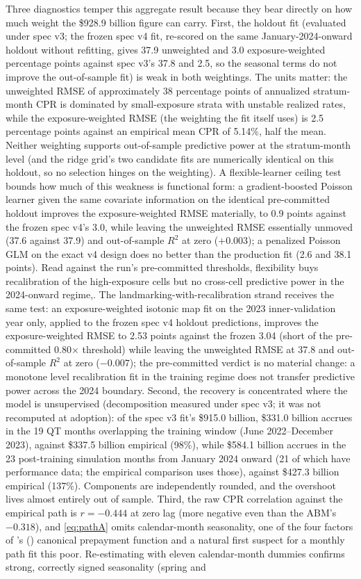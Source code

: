 \documentclass[12pt]{article}
\newcommand{\citepos}[1]{\citeauthor{#1}'s (\citeyear{#1})}
\begin{document}
Three diagnostics temper this aggregate result because they bear directly on how much weight the \$928.9 billion figure can carry. First, the holdout fit (evaluated under spec v3; the frozen spec v4 fit, re-scored on the same January-2024-onward holdout without refitting, gives 37.9 unweighted and 3.0 exposure-weighted percentage points against spec v3's 37.8 and 2.5, so the seasonal terms do not improve the out-of-sample fit) is weak in both weightings. The units matter: the unweighted RMSE of approximately 38 percentage points of annualized stratum-month CPR is dominated by small-exposure strata with unstable realized rates, while the exposure-weighted RMSE (the weighting the fit itself uses) is 2.5 percentage points against an empirical mean CPR of 5.14\%, half the mean. Neither weighting supports out-of-sample predictive power at the stratum-month level (and the ridge grid's two candidate fits are numerically identical on this holdout, so no selection hinges on the weighting). A flexible-learner ceiling test bounds how much of this weakness is functional form: a gradient-boosted Poisson learner given the same covariate information on the identical pre-committed holdout improves the exposure-weighted RMSE materially, to 0.9 points against the frozen spec v4's 3.0, while leaving the unweighted RMSE essentially unmoved (37.6 against 37.9) and out-of-sample $R^2$ at zero ($+0.003$); a penalized Poisson GLM on the exact v4 design does no better than the production fit (2.6 and 38.1 points). Read against the run's pre-committed thresholds, flexibility buys recalibration of the high-exposure cells but no cross-cell predictive power in the 2024-onward regime,. The landmarking-with-recalibration strand receives the same test: an exposure-weighted isotonic map fit on the 2023 inner-validation year only, applied to the frozen spec v4 holdout predictions, improves the exposure-weighted RMSE to 2.53 points against the frozen 3.04 (short of the pre-committed 0.80$\times$ threshold) while leaving the unweighted RMSE at 37.8 and out-of-sample $R^2$ at zero ($-0.007$); the pre-committed verdict is no material change: a monotone level recalibration fit in the training regime does not transfer predictive power across the 2024 boundary. Second, the recovery is concentrated where the model is unsupervised (decomposition measured under spec v3; it was not recomputed at adoption): of the spec v3 fit's \$915.0 billion, \$331.0 billion accrues in the 19 QT months overlapping the training window (June 2022--December 2023), against \$337.5 billion empirical (98\%), while \$584.1 billion accrues in the 23 post-training simulation months from January 2024 onward (21 of which have performance data; the empirical comparison uses those), against \$427.3 billion empirical (137\%). Components are independently rounded, and the overshoot lives almost entirely out of sample. Third, the raw CPR correlation against the empirical path is $r = -0.444$ at zero lag (more negative even than the ABM's $-0.318$), and \eqref{eq:pathA} omits calendar-month seasonality, one of the four factors of \citepos{richard1989} canonical prepayment function and a natural first suspect for a monthly path fit this poor. Re-estimating with eleven calendar-month dummies confirms strong, correctly signed seasonality (spring and 
\end{document}
